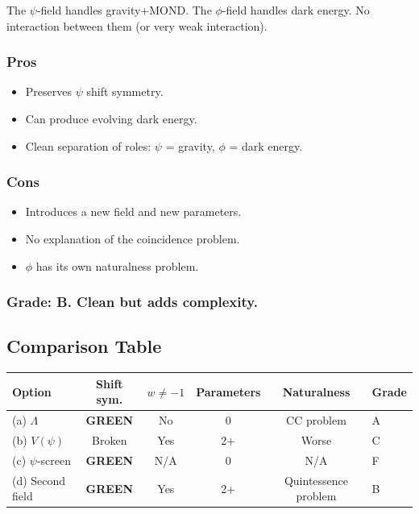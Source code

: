 \documentclass[11pt,a4paper]{article}
\newcommand{\GREEN}{\textcolor{dfdgreen}{\textbf{GREEN}}}
\begin{document}
The $\psi$-field handles gravity+MOND. The $\phi$-field handles dark energy. No interaction between them (or very weak interaction).

\subsubsection{Pros}
\begin{itemize}
\item Preserves $\psi$ shift symmetry.
\item Can produce evolving dark energy.
\item Clean separation of roles: $\psi$ = gravity, $\phi$ = dark energy.
\end{itemize}

\subsubsection{Cons}
\begin{itemize}
\item Introduces a new field and new parameters.
\item No explanation of the coincidence problem.
\item $\phi$ has its own naturalness problem.
\end{itemize}

\subsubsection{Grade: B. Clean but adds complexity.}

\subsection{Comparison Table}

\begin{center}
\begin{tabular}{lccccl}
\toprule
\textbf{Option} & \textbf{Shift sym.} & \textbf{$w \neq -1$} & \textbf{Parameters} & \textbf{Naturalness} & \textbf{Grade} \\
\midrule
(a) $\Lambda$ & \GREEN & No & 0 & CC problem & A \\
(b) $V(\psi)$ & Broken & Yes & 2+ & Worse & C \\
(c) $\psi$-screen & \GREEN & N/A & 0 & N/A & F \\
(d) Second field & \GREEN & Yes & 2+ & Quintessence problem & B \\
\bottomrule
\end{tabular}
\end{center}
\end{document}
